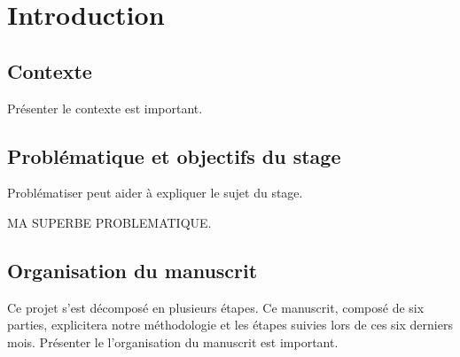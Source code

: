 \chapter*{Introduction}
\section*{Contexte}

Présenter le contexte est important.
\lipsum[3-5]

\section*{Problématique et objectifs du stage}

Problématiser peut aider à expliquer le sujet du stage.

\begin{framed}
  MA SUPERBE PROBLEMATIQUE.
\end{framed}

\section*{Organisation du manuscrit}

Ce projet s'est décomposé en plusieurs étapes. Ce manuscrit, composé de six parties, explicitera notre méthodologie et les étapes suivies lors de ces six derniers mois. Présenter le l'organisation du manuscrit est important.
\lipsum[1]
